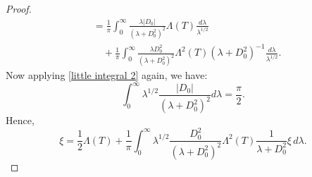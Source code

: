 \begin{proof}
\begin{align*}
                              &= \frac{1}{\pi}\int_0^\infty \frac{\lambda|D_0|}{(\lambda+D_0^2)^2}\Lambda(T)\frac{d\lambda}{\lambda^{1/2}}\\
                              &\quad+\frac{1}{\pi}\int_0^\infty \frac{\lambda D_0^2}{(\lambda+D_0^2)^2}\Lambda^2(T)(\lambda+D_0^2)^{-1}\frac{d\lambda}{\lambda^{1/2}}.
        \end{align*}
        Now applying \eqref{little integral 2} again, we have:
        \begin{equation*}
            \int_0^\infty \lambda^{1/2}\frac{|D_0|}{(\lambda+D_0^2)^2}d\lambda = \frac{\pi}{2}.
        \end{equation*}
        Hence,
        \begin{equation*}
            [|D_0|,T]\xi = \frac{1}{2}\Lambda(T) + \frac{1}{\pi}\int_0^\infty \lambda^{1/2}\frac{D_0^2}{(\lambda+D_0^2)^2}\Lambda^2(T)\frac{1}{\lambda+D_0^2}\xi\,d\lambda.
        \end{equation*}
    \end{proof}

